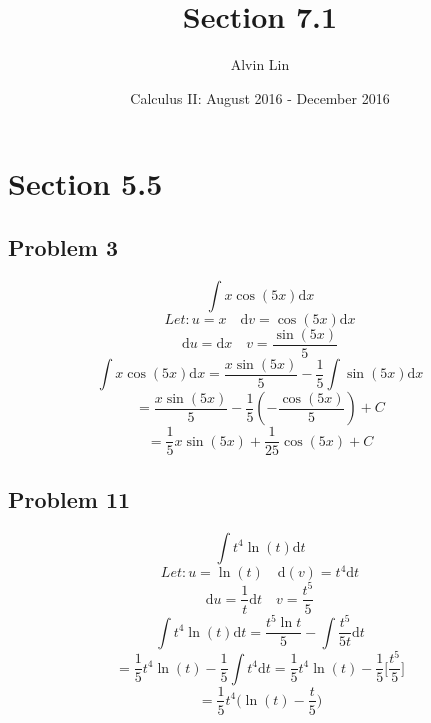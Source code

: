 \documentclass[letterpaper, 12pt]{article}
\title{Section 7.1}
\author{Alvin Lin}
\date{Calculus II: August 2016 - December 2016}
\newcommand*{\diff}{\mathrm{d}}
\begin{document}
\maketitle

\section*{Section 5.5}

\subsection*{Problem 3}
\[ \int{x\cos(5x)\diff{x}} \]
\[ Let: u = x\quad \diff{v} = \cos(5x)\diff{x} \]
\[ \diff{u} = \diff{x}\quad v = \frac{\sin(5x)}{5} \]
\[ \int{x\cos(5x)\diff{x}} =
   \frac{x\sin(5x)}{5}-\frac{1}{5}\int{\sin(5x)\diff{x}} \]
\[ = \frac{x\sin(5x)}{5}-\frac{1}{5}(-\frac{\cos(5x)}{5})+C \]
\[ = \frac{1}{5}x\sin(5x)+\frac{1}{25}\cos(5x)+C \]

\subsection*{Problem 11}
\[ \int{t^{4}\ln(t)\diff{t}} \]
\[ Let: u = \ln(t) \quad \diff(v) = t^{4}\diff{t} \]
\[ \diff{u} = \frac{1}{t}\diff{t} \quad v = \frac{t^{5}}{5} \]
\[ \int{t^{4}\ln(t)\diff{t}} =
   \frac{t^{5}\ln{t}}{5}-\int{\frac{t^{5}}{5t}\diff{t}} \]
\[ = \frac{1}{5}t^{4}\ln(t)-\frac{1}{5}\int{t^{4}}\diff{t}
   = \frac{1}{5}t^{4}\ln(t)-\frac{1}{5}\bigg[\frac{t^{5}}{5}\bigg] \]
\[ = \frac{1}{5}t^{4}\bigg(\ln(t)-\frac{t}{5}\bigg) \]
\end{document}
